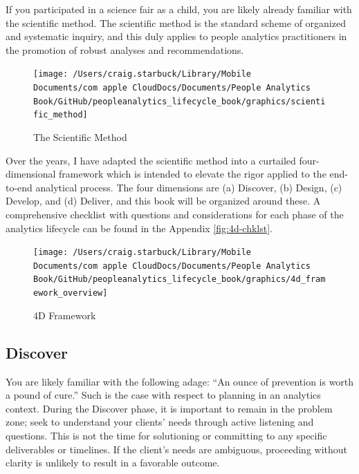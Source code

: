 \documentclass[]{book}
\begin{document}
If you participated in a science fair as a child, you are likely already familiar with the scientific method. The scientific method is the standard scheme of organized and systematic inquiry, and this duly applies to people analytics practitioners in the promotion of robust analyses and recommendations.

\begin{figure}

{\centering \texttt{[image: /Users/craig.starbuck/Library/Mobile Documents/com~apple~CloudDocs/Documents/People Analytics Book/GitHub/peopleanalytics\_lifecycle\_book/graphics/scientific\_method]} 

}

\caption{The Scientific Method}\label{fig:sci-method}
\end{figure}

Over the years, I have adapted the scientific method into a curtailed four-dimensional framework which is intended to elevate the rigor applied to the end-to-end analytical process. The four dimensions are (a) Discover, (b) Design, (c) Develop, and (d) Deliver, and this book will be organized around these. A comprehensive checklist with questions and considerations for each phase of the analytics lifecycle can be found in the Appendix \ref{fig:4d-chklst}.

\begin{figure}

{\centering \texttt{[image: /Users/craig.starbuck/Library/Mobile Documents/com~apple~CloudDocs/Documents/People Analytics Book/GitHub/peopleanalytics\_lifecycle\_book/graphics/4d\_framework\_overview]} 

}

\caption{4D Framework}\label{fig:4d-framework}
\end{figure}

\hypertarget{discover}{%
\subsection{Discover}\label{discover}}

You are likely familiar with the following adage: ``An ounce of prevention is worth a pound of cure.'' Such is the case with respect to planning in an analytics context. During the Discover phase, it is important to remain in the problem zone; seek to understand your clients' needs through active listening and questions. This is not the time for solutioning or committing to any specific deliverables or timelines. If the client's needs are ambiguous, proceeding without clarity is unlikely to result in a favorable outcome.
\end{document}

